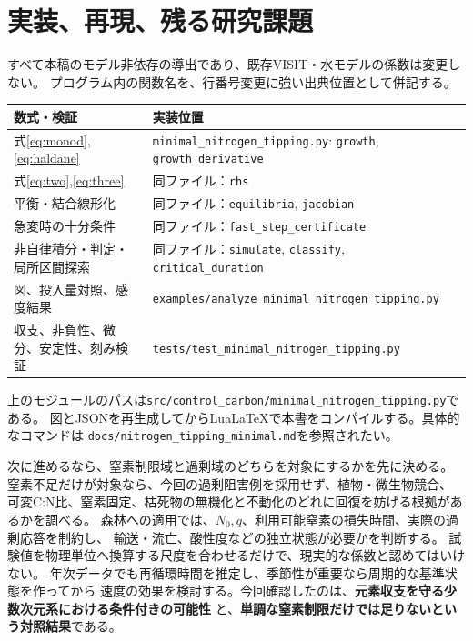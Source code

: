 \documentclass[a4paper,11pt]{ltjsarticle}
\newcommand{\code}[1]{\nolinkurl{#1}}
\begin{document}
\section{実装、再現、残る研究課題}
すべて本稿のモデル非依存の導出であり、既存VISIT・水モデルの係数は変更しない。
プログラム内の関数名を、行番号変更に強い出典位置として併記する。
\begin{longtable}{p{.34\linewidth}p{.58\linewidth}}
\toprule 数式・検証 & 実装位置\\\midrule\endhead
式\eqref{eq:monod},\eqref{eq:haldane} & \code{minimal_nitrogen_tipping.py}: \code{growth}, \code{growth_derivative}\\
式\eqref{eq:two},\eqref{eq:three} & 同ファイル：\code{rhs}\\
平衡・結合線形化 & 同ファイル：\code{equilibria}, \code{jacobian}\\
急変時の十分条件 & 同ファイル：\code{fast_step_certificate}\\
非自律積分・判定・局所区間探索 & 同ファイル：\code{simulate}, \code{classify}, \code{critical_duration}\\
図、投入量対照、感度結果 & \code{examples/analyze_minimal_nitrogen_tipping.py}\\
収支、非負性、微分、安定性、刻み検証 & \code{tests/test_minimal_nitrogen_tipping.py}\\
\bottomrule
\end{longtable}
上のモジュールのパスは\code{src/control_carbon/minimal_nitrogen_tipping.py}である。
図とJSONを再生成してからLuaLaTeXで本書をコンパイルする。具体的なコマンドは
\code{docs/nitrogen_tipping_minimal.md}を参照されたい。

次に進めるなら、窒素制限域と過剰域のどちらを対象にするかを先に決める。
窒素不足だけが対象なら、今回の過剰阻害例を採用せず、植物・微生物競合、
可変C:N比、窒素固定、枯死物の無機化と不動化のどれに回復を妨げる根拠があるかを調べる。
森林への適用では、$N_0,q$、利用可能窒素の損失時間、実際の過剰応答を制約し、
輸送・流亡、酸性度などの独立状態が必要かを判断する。
試験値を物理単位へ換算する尺度を合わせるだけで、現実的な係数と認めてはいけない。
年次データでも再循環時間を推定し、季節性が重要なら周期的な基準状態を作ってから
速度の効果を検討する。今回確認したのは、\textbf{元素収支を守る少数次元系における条件付きの可能性}
と、\textbf{単調な窒素制限だけでは足りないという対照結果}である。
\end{document}
